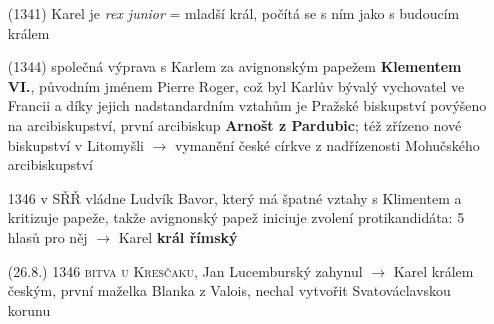 \documentclass{article}
\begin{document}
\begin{itemize}
    \item[(1341)] Karel je \textit{rex junior} = mladší král, počítá se s ním jako s budoucím králem
    \item[(1344)] společná výprava s Karlem za avignonským papežem \textbf{Klementem VI.}, původním jménem Pierre Roger, což byl Karlův bývalý vychovatel ve Francii a díky jejich nadstandardním vztahům je Pražské biskupství povýšeno na arcibiskupství, první arcibiskup \textbf{Arnošt z Pardubic}; též zřízeno nové biskupství v Litomyšli $\rightarrow$ vymanění české církve z nadřízenosti Mohučského arcibiskupství
    \item[1346] v SŘŘ vládne Ludvík Bavor, který má špatné vztahy s Klimentem a kritizuje papeže, takže avignonský papež iniciuje zvolení protikandidáta: 5 hlasů pro něj $\rightarrow$ Karel \textbf{král římský}
    \item[(26.8.) 1346] \textsc{bitva u Kresčaku}, Jan Lucemburský zahynul $\rightarrow$ Karel králem českým, první maželka Blanka z Valois, nechal vytvořit Svatováclavskou korunu
\end{itemize}
\end{document}
